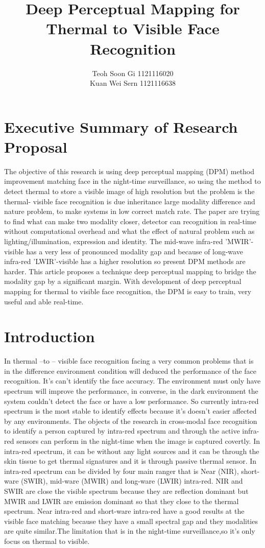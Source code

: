 \documentclass[a4paper, 12pt]{article}
\title{\textbf{Deep Perceptual Mapping for Thermal to Visible Face Recognition}}
\author{Teoh Soon Gi 1121116020
		\\Kuan Wei Sern 1121116638}
\begin{document}
\maketitle

\section{Executive Summary of Research Proposal}

The objective of this research is using deep perceptual mapping (DPM) method improvement matching face in the night-time surveillance, so using the method to detect thermal to store a visible image of high resolution but the problem is the thermal- visible face recognition is due inheritance large modality difference and nature problem, to make systems in low correct match rate. The paper are trying to find what can make two modality closer, detector can recognition in real-time without computational overhead and what the effect of natural problem such as lighting/illumination, expression and identity. The mid-wave infra-red 'MWIR'-visible has a very less of pronounced modality gap and because of long-wave infra-red 'LWIR'-visible has a higher resolution so present DPM methods are harder. This article proposes a technique deep perceptual mapping to bridge the modality gap by a significant margin. With development of deep perceptual mapping for thermal to visible face recognition, the DPM is easy to train, very useful and able real-time.


\section{Introduction}

    In thermal –to – visible face recognition facing a very common problems that is in the difference environment condition will deduced the performance of the face recognition. It’s can’t identify the face accuracy. The environment must only have spectrum will improve the performance, in converse, in the dark environment the system couldn’t detect the face or have a low performance. So currently intra-red spectrum is the most stable to identify effects because it’s doesn’t easier affected by any environments. The objects of the research in cross-modal face recognition to identify a person captured by intra-red spectrum and through the active infra-red sensors can perform in the night-time when the image is captured covertly. In intra-red spectrum, it can be without any light sources and it can be through the skin tissue to get thermal signatures and it is through passive thermal sensor. In intra-red spectrum can be divided by four main ranger that is Near (NIR), short-ware (SWIR), mid-ware (MWIR) and long-ware (LWIR) intra-red. NIR and SWIR are close the visible spectrum because they are reflection dominant but MWIR and LWIR are emission dominant so that they close to the thermal spectrum. Near intra-red and short-ware intra-red have a good results at the visible face matching because they have a small spectral gap and they modalities are quite similar.The limitation that is in the night-time surveillance,so it's only focus on thermal to visible. 
\end{document}
